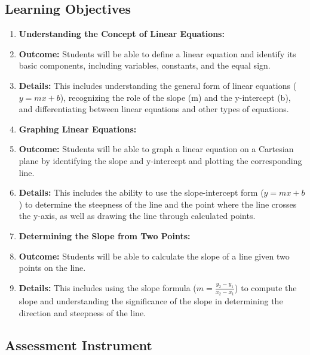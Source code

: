 \subsection{Learning Objectives}
\label{ssec:lear-fe6e}


\begin{enumerate}
    \item \textbf{Understanding the Concept of Linear Equations:}
    \item \textbf{Outcome:} Students will be able to define a linear equation and identify its basic components, including variables, constants, and the equal sign.
    \item \textbf{Details:} This includes understanding the general form of linear equations ($y = mx + b$), recognizing the role of the slope (m) and the y-intercept (b), and differentiating between linear equations and other types of equations.
    \item \textbf{Graphing Linear Equations:}
    \item \textbf{Outcome:} Students will be able to graph a linear equation on a Cartesian plane by identifying the slope and y-intercept and plotting the corresponding line.
    \item \textbf{Details:} This includes the ability to use the slope-intercept form ($y = mx + b$) to determine the steepness of the line and the point where the line crosses the y-axis, as well as drawing the line through calculated points.
    \item \textbf{Determining the Slope from Two Points:}
    \item \textbf{Outcome:} Students will be able to calculate the slope of a line given two points on the line.
    \item \textbf{Details:} This includes using the slope formula ($m = \frac{y _2 - y _1}{x _2 - x _1}$) to compute the slope and understanding the significance of the slope in determining the direction and steepness of the line.
\end{enumerate}


\subsection{Assessment Instrument}
\label{ssec:asse-3669}


